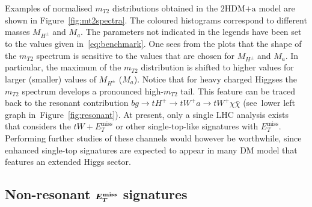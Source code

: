 \documentclass[a4paper, 11pt,notoc]{article}
\newcommand{\MET}{\ensuremath{E_T^\mathrm{miss}}\xspace}
\newcommand{\ma}{\ensuremath{M_{a}}\xspace}
\newcommand{\mHc}{\ensuremath{M_{H^{\pm}}}\xspace}
\newcommand{\hdma}{\ensuremath{\textrm{2HDM+a}}\xspace}
\def\bm#1{\mbox{\boldmath$#1$\unboldmath}}
\begin{document}
Examples of normalised $m_{T2}$ distributions obtained in the \hdma model are shown in Figure~\ref{fig:mt2spectra}. The coloured histograms correspond to different masses $\mHc$ and $\ma$. The parameters not indicated in the legends have been set to the values given in~\eqref{eq:benchmark}. One sees from the plots that the shape of the $m_{T2}$ spectrum is sensitive to the values that are chosen for $\mHc$ and $\ma$. In particular, the maximum of the $m_{T2}$ distribution is shifted to higher values for larger (smaller) values of $\mHc$ ($\ma$). Notice that for heavy charged Higgses the $m_{T2}$ spectrum develops a pronounced high-$m_{T2}$ tail.  This feature can be traced back to the resonant contribution $b g \to t H^+  \to  t W^+ a  \to t W^+ \chi \bar \chi$ (see~lower left graph in~Figure~\ref{fig:resonant}). {\color{green} At present, only a single LHC analysis exists~\cite{CMS-PAS-EXO-18-010}  that considers the $tW + \MET$  or other single-top-like signatures with $\MET$. Performing further studies of these channels would however be worthwhile, since enhanced single-top signatures are expected to appear in many DM model that features an extended Higgs sector. }

\subsection[Non-resonant $E_T^{\rm miss}$ signatures]{Non-resonant $\bm{E_T^{\rm miss}}$ signatures}
\label{sec:nonresonant}
\end{document}
